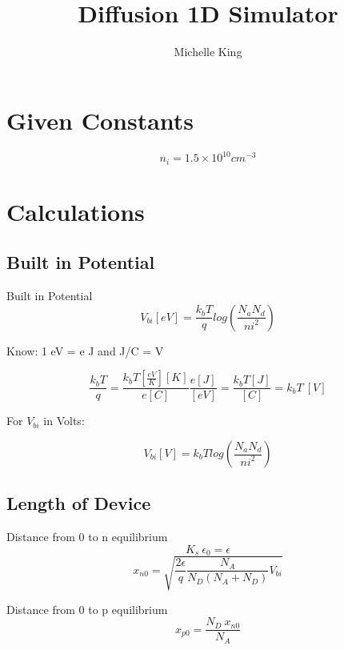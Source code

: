 \documentclass[12pt]{article}
\begin{document}
\title{Diffusion 1D Simulator}
\author{Michelle King}

\begin{titlepage}
\maketitle
\end{titlepage}

\tableofcontents
\pagebreak

\section{Given Constants}
\[
n_{i}=1.5 \times 10^{10} cm^{-3}
\]

\section{Calculations}
\subsection{Built in Potential \cite[p. 222]{Pierret1996}}
Built in Potential \cite[eq. 5.10]{Pierret1996}
\begin{equation}
V_{bi} [eV]=\frac{k_{b} T}{q}log(\frac{N_{a}N_{d}}{ni^{2}})
\end{equation}

Know: 1 eV = e J and J/C = V

\begin{equation}
\frac{k_{b} T}{q} = 
\frac{k_{b} T [\frac{eV}{K}][K]}{e[C]}\frac{e[J]}{[eV]}=
\frac{k_{b} T [J]}{[C]}=
k_{b} T \ [V]
\end{equation}

For $V_{bi}$ in Volts:

\begin{equation}
V_{bi} [V]=k_{b} Tlog(\frac{N_{a}N_{d}}{ni^{2}})
\end{equation}

\subsection{Length of Device}

Distance from 0 to n equilibrium \cite[eq. 5.30a]{Pierret1996}
\[
K_{s} \ \epsilon_{0}=\epsilon
\]
\[
x_{n0}=\sqrt{\frac{2\epsilon}{q}\frac{N_{A}}{N_{D}(N_{A}+N_{D})}V_{bi}}
\]

Distance from 0 to p equilibrium \cite[eq. 5.30b]{Pierret1996}
\[
x_{p0}=\frac{N_{D} \ x_{n0}}{N_{A}}
\]
\end{document}
